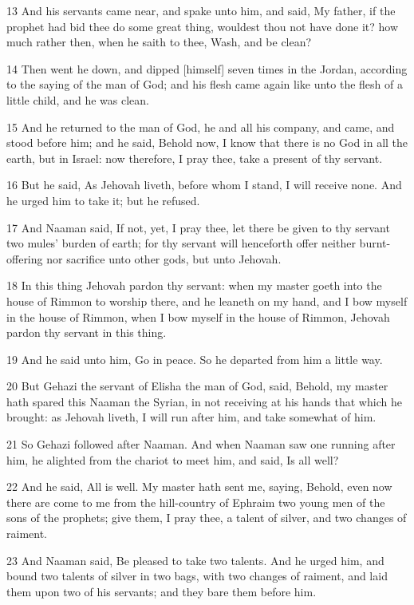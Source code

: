 \par 13 And his servants came near, and spake unto him, and said, My father, if the prophet had bid thee do some great thing, wouldest thou not have done it? how much rather then, when he saith to thee, Wash, and be clean?
\par 14 Then went he down, and dipped [himself] seven times in the Jordan, according to the saying of the man of God; and his flesh came again like unto the flesh of a little child, and he was clean.
\par 15 And he returned to the man of God, he and all his company, and came, and stood before him; and he said, Behold now, I know that there is no God in all the earth, but in Israel: now therefore, I pray thee, take a present of thy servant.
\par 16 But he said, As Jehovah liveth, before whom I stand, I will receive none. And he urged him to take it; but he refused.
\par 17 And Naaman said, If not, yet, I pray thee, let there be given to thy servant two mules' burden of earth; for thy servant will henceforth offer neither burnt-offering nor sacrifice unto other gods, but unto Jehovah.
\par 18 In this thing Jehovah pardon thy servant: when my master goeth into the house of Rimmon to worship there, and he leaneth on my hand, and I bow myself in the house of Rimmon, when I bow myself in the house of Rimmon, Jehovah pardon thy servant in this thing.
\par 19 And he said unto him, Go in peace. So he departed from him a little way.
\par 20 But Gehazi the servant of Elisha the man of God, said, Behold, my master hath spared this Naaman the Syrian, in not receiving at his hands that which he brought: as Jehovah liveth, I will run after him, and take somewhat of him.
\par 21 So Gehazi followed after Naaman. And when Naaman saw one running after him, he alighted from the chariot to meet him, and said, Is all well?
\par 22 And he said, All is well. My master hath sent me, saying, Behold, even now there are come to me from the hill-country of Ephraim two young men of the sons of the prophets; give them, I pray thee, a talent of silver, and two changes of raiment.
\par 23 And Naaman said, Be pleased to take two talents. And he urged him, and bound two talents of silver in two bags, with two changes of raiment, and laid them upon two of his servants; and they bare them before him.
